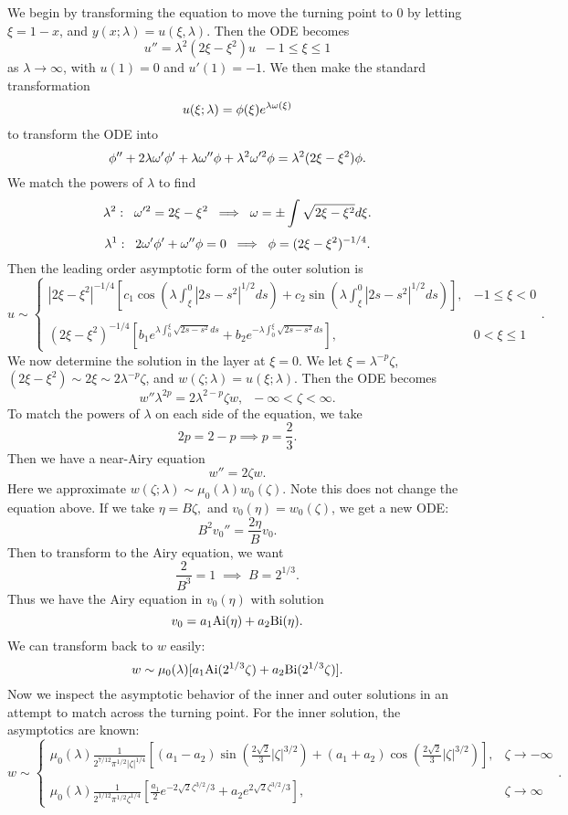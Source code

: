 We begin by transforming the equation to move the turning point to 0 by letting $\xi=1-x$, and $y(x;\lambda)=u(\xi,\lambda)$. Then the ODE becomes
$$u''=\lambda^2(2\xi-\xi^2)u\;\;-1\leq \xi\leq 1$$
as $\lambda\to\infty$, with $u(1)=0$ and $u'(1)=-1.$ We then make the standard transformation
$$u(\xi;\lambda)=\phi(\xi)e^{\lambda\omega(\xi)}$$
to transform the ODE into
$$\phi''+2\lambda\omega'\phi'+\lambda\omega''\phi+\lambda^2\omega'^2\phi=\lambda^2(2\xi-\xi^2)\phi.$$
We match the powers of $\lambda$ to find
$$\lambda^2:\;\; \omega'^2=2\xi-\xi^2\;\implies\; \omega=\pm\int\sqrt{2\xi-\xi^2}d\xi.$$
$$\lambda^1:\;\; 2\omega'\phi'+\omega''\phi=0\;\implies\;\phi=(2\xi-\xi^2)^{-1/4}.$$
Then the leading order asymptotic form of the outer solution is
$$u\sim \left\{\begin{array}{cc}|2\xi-\xi^2|^{-1/4}\left[c_1\cos\left(\lambda\int_\xi^0|2s-s^2|^{1/2}ds\right)+c_2\sin\left(\lambda\int_\xi^0|2s-s^2|^{1/2}ds\right)\right],&-1\leq\xi<0\\ \\
(2\xi-\xi^2)^{-1/4}\left[b_1e^{\lambda\int_0^\xi\sqrt{2s-s^2}ds}+b_2e^{-\lambda\int_0^\xi\sqrt{2s-s^2}ds}\right],&0<\xi\leq 1\end{array}\right..$$
\indent We now determine the solution in the layer at $\xi=0.$ We let $\xi=\lambda^{-p}\zeta$, $(2\xi-\xi^2)\sim2\xi\sim2\lambda^{-p}\zeta$, and $w(\zeta;\lambda)=u(\xi;\lambda).$ Then the ODE becomes
$$w''\lambda^{2p}=2\lambda^{2-p}\zeta w,\;\;-\infty<\zeta<\infty.$$
To match the powers of $\lambda$ on each side of the equation, we take
$$2p=2-p\implies p=\frac{2}{3}.$$
Then we have a near-Airy equation
$$w''=2\zeta w.$$
Here we approximate $w(\zeta;\lambda)\sim\mu_0(\lambda)w_0(\zeta).$ Note this does not change the equation above.
If we take $\eta=B\zeta,$ and $v_0(\eta)=w_0(\zeta)$, we get a new ODE:
$$B^2v_0''=\frac{2\eta}{B}v_0.$$
Then to transform to the Airy equation, we want
$$\frac{2}{B^3}=1\;\implies\;B=2^{1/3}.$$
Thus we have the Airy equation in $v_0(\eta)$ with solution
$$v_0=a_1{\rm Ai}(\eta)+a_2{\rm Bi}(\eta).$$
We can transform back to $w$ easily:
$$w\sim\mu_0(\lambda)[a_1{\rm Ai}(2^{1/3}\zeta)+a_2{\rm Bi}(2^{1/3}\zeta)].$$
Now we inspect the asymptotic behavior of the inner and outer solutions in an attempt to match across the turning point. For the inner solution, the asymptotics are known:
$$w\sim\left\{\begin{array}{cc}\mu_0(\lambda)\frac{1}{2^{7/12}\pi^{1/2}|\zeta|^{1/4}}\left[(a_1-a_2)\sin\left(\frac{2\sqrt{2}}{3}|\zeta|^{3/2}\right)+(a_1+a_2)\cos\left(\frac{2\sqrt{2}}{3}|\zeta|^{3/2}\right)\right],&\zeta\to-\infty\\ \\
\mu_0(\lambda)\frac{1}{2^{1/12}\pi^{1/2}\zeta^{1/4}}\left[\frac{a_1}{2}e^{-2\sqrt{2}\zeta^{3/2}/3}+a_2e^{2\sqrt{2}\zeta^{3/2}/3}\right],&\zeta\to\infty\end{array}\right..$$
